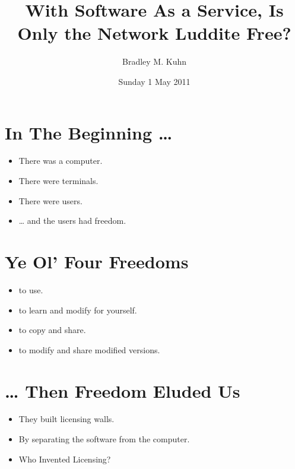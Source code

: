 \documentclass{article}
\title{With Software As a Service, Is Only the Network Luddite Free?}
\author{Bradley M. Kuhn}
\date{Sunday 1 May 2011}
\begin{document}
\maketitle

\section{In The Beginning \ldots{}}

\begin{itemize}
\item 
  There was a computer.

\item 
  There were terminals.

\item 
  There were users.

\item 
  \ldots{} and the users had freedom.

\end{itemize}
\section{Ye Ol' Four Freedoms}

\begin{itemize}
\item 
  to use.

\item 
  to learn and modify for yourself.

\item 
  to copy and share.

\item 
  to modify and share modified versions.

\end{itemize}
\section{… Then Freedom Eluded Us}

\begin{itemize}
\item 
  They built licensing walls.

\item 
  By separating the software from the computer.

\end{itemize}
\begin{itemize}
\item 
  Who Invented Licensing?
\end{itemize}
\end{document}
